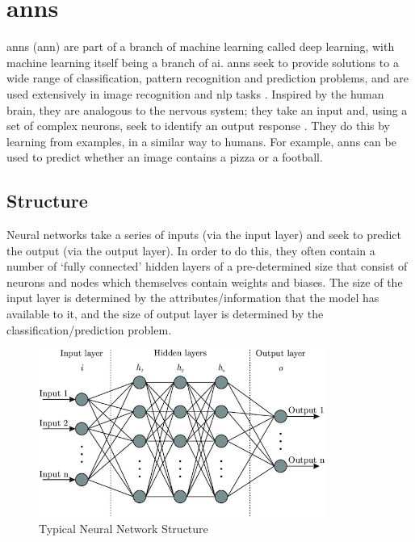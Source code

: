 
\section{\acrlong{ann}s}
\label{sec:background_anns}

\acrlong{ann}s (\acrshort{ann}) are part of a branch of machine learning called deep learning, with machine learning itself being a branch of \acrlong{ai}. \acrshort{ann}s seek to provide solutions to a wide range of classification, pattern recognition and prediction problems, and are used extensively in image recognition and \acrfull{nlp} tasks \citep{Abiodun}. Inspired by the human brain, they are analogous to the nervous system; they take an input and, using a set of complex neurons, seek to identify an output response \citep{Bishop}. They do this by learning from examples, in a similar way to humans. For example, \acrshort{ann}s can be used to predict whether an image contains a pizza or a football.

\subsection{Structure}
\label{sec:background_anns_structure}

Neural networks take a series of inputs (via the input layer) and seek to predict the output (via the output layer). In order to do this, they often contain a number of `fully connected' hidden layers of a pre-determined size that consist of neurons and nodes which themselves contain weights and biases. The size of the input layer is determined by the attributes/information that the model has available to it, and the size of output layer is determined by the classification/prediction problem. 

\begin{figure}[h]
    \centering
    \includegraphics[height=5.5cm] {Paper/images/neural_network_structure.jpeg} %
    \caption{Typical Neural Network Structure \citep{Shukla}}
    \label{fig:neural_network_structure}
\end{figure}

